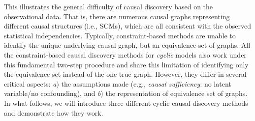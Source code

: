 \documentclass[11pt]{article}
\theoremstyle{definition}
\begin{document}
This illustrates the general difficulty of causal discovery based on the observational data. That is, there are numerous causal graphs representing different causal structures (i.e., SCMs), which are all consistent with the observed statistical independencies. Typically, constraint-based methods are unable to identify the unique underlying causal graph, but an equivalence set of graphs. All the constraint-based causal discovery methods for \textit{cyclic} models also work under this fundamental two-step procedure and share this limitation of identifying only the equivalence set instead of the one true graph. However, they differ in several critical aspects: \textit{a}) the assumptions made (e.g., \textit{causal sufficiency}: no latent variable/no confounding), and \textit{b}) the representation of equivalence set of graphs. In what follows, we will introduce three different cyclic causal discovery methods and demonstrate how they work.
\end{document}
